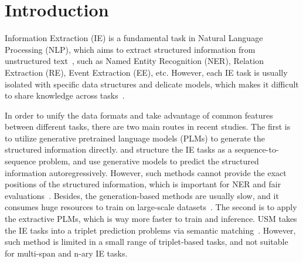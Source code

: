 \section{Introduction}

Information Extraction (IE) is a fundamental task in Natural Language Processing (NLP), which aims to extract structured information from unstructured text~\cite{grishman_2019}, such as Named Entity Recognition (NER), Relation Extraction (RE), Event Extraction (EE), etc.
However, each IE task is usually isolated with specific data structures and delicate models, which makes it difficult to share knowledge across tasks~\cite{uie,genie}.

In order to unify the data formats and take advantage of common features between different tasks, there are two main routes in recent studies.
The first is to utilize generative pretrained language models (PLMs) to generate the structured information directly.
\citet{uie} and \citet{tanl} structure the IE tasks as a sequence-to-sequence problem, and use generative models to predict the structured information autoregressively.
However, such methods cannot provide the exact positions of the structured information, which is important for NER and fair evaluations~\cite{devil-ee}.
Besides, the generation-based methods are usually slow, and it consumes huge resources to train on large-scale datasets~\cite{deepstruct}.
The second is to apply the extractive PLMs, which is way more faster to train and inference.
USM takes the IE tasks into a triplet prediction problems via semantic matching~\cite{usm}.
However, such method is limited in a small range of triplet-based tasks, and not suitable for multi-span and n-ary IE tasks.

